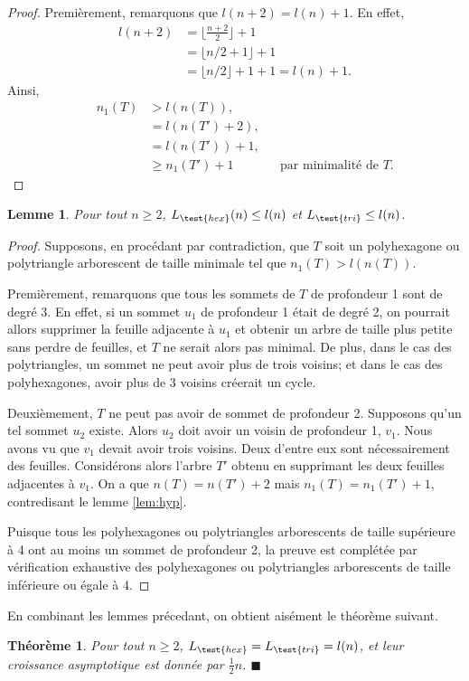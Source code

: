 \documentclass{article}
\newtheorem{thm}{Théorème}[section]
\newtheorem{lem}{Lemme}[section]
\theoremstyle{definition}
\newcommand{\Lhex}{L_{\test{hex}}}
\newcommand{\Ltri}{L_{\test{tri}}}
\begin{document}
\begin{proof}
   Premièrement, remarquons que $l(n + 2) = l(n) + 1$. En effet,
   \begin{align*}
      l(n+2) &= \lfloor \frac{n+2}{2} \rfloor + 1 \\
             &= \lfloor n/2 + 1 \rfloor + 1 \\
             &= \lfloor n/2 \rfloor + 1 + 1 = l(n) + 1.
   \end{align*}
   Ainsi,
   \begin{align*}
      && n_1(T) &> l(n(T)), && \\
      &&      &= l(n(T') + 2), && \\
      &&       &= l(n(T')) + 1, &&  \\
      &&       &\geq n_1(T') + 1 && \text{par minimalité de $T$.}
   \end{align*}
\end{proof}

\begin{lem}
   Pour tout $n \geq 2$, $\Lhex(n) \leq l(n)$ et $\Ltri \leq l(n)$.
\end{lem}

\begin{proof}
   Supposons, en procédant par contradiction, que $T$ soit un polyhexagone ou polytriangle arborescent de taille minimale tel que $n_1(T) > l(n(T))$.

   Premièrement, remarquons que tous les sommets de $T$ de profondeur 1 sont de degré 3. En effet, si un sommet $u_1$ de profondeur 1 était de degré 2, on pourrait allors supprimer la feuille adjacente à $u_1$ et obtenir un arbre de taille plus petite sans perdre de feuilles, et $T$ ne serait alors pas minimal. De plus, dans le cas des polytriangles, un sommet ne peut avoir plus de trois voisins; et dans le cas des polyhexagones, avoir plus de 3 voisins créerait un cycle.

   Deuxièmement, $T$ ne peut pas avoir de sommet de profondeur 2. Supposons qu'un tel sommet $u_2$ existe. Alors $u_2$ doit avoir un voisin de profondeur 1, $v_1$. Nous avons vu que $v_1$ devait avoir trois voisins. Deux d'entre eux sont nécessairement des feuilles. Considérons alors l'arbre $T'$ obtenu en supprimant les deux feuilles adjacentes à $v_1$. On a que $n(T) = n(T') + 2$ mais $n_1(T) = n_1(T') + 1$, contredisant le lemme \ref{lem:hyp}.

   Puisque tous les polyhexagones ou polytriangles arborescents de taille supérieure à 4 ont au moins un sommet de profondeur 2, la preuve est complétée par vérification exhaustive des polyhexagones ou polytriangles arborescents de taille inférieure ou égale à 4.
\end{proof}

En combinant les lemmes précedant, on obtient aisément le théorème suivant.

\begin{thm}
   Pour tout $n \geq 2$, $\Lhex = \Ltri = l(n)$, et leur croissance asymptotique est donnée par $\frac{1}{2}n$. \hfill $\blacksquare$
\end{thm}
\end{document}

